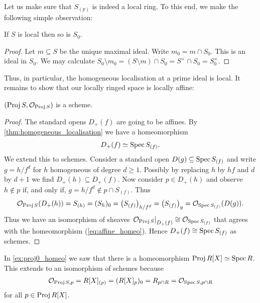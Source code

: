 \documentclass{article}
\begin{document}
Let us make sure that $S_{(p)}$ is indeed a local ring. To this end,
we make the following simple observation:
\begin{lemma}
  If $S$ is local then so is $S_0$.
  \begin{proof}
    Let $m\subseteq S$ be the unique maximal ideal. Write
    $m_0 = m \cap S_0$. This is an ideal in $S_0$. We may calculate
    $S_0\setminus m_0 = (S\setminus m)\cap S_0 = S^\times\cap S_0 = S_0^\times$.
  \end{proof}
\end{lemma}
Thus, in particular, the homogeneous localisation at a prime ideal
is local. It remains to show that our locally ringed space is
locally affine:

\begin{proposition}
  $(\operatorname{Proj} S, \mathcal O_{\operatorname{Proj} S})$ is a scheme.
  \begin{proof}
    The standard opens $D_+(f)$ are going to be affines.
    By \ref{thm:homogeneous_localisation} we have a homeomorphism
    \begin{align}\label{eq:affine_homeo}
      D_+(f) \simeq \operatorname{Spec} S_{(f)}.
    \end{align}
    We extend this to schemes. Consider a standard open
    $D(g)\subseteq \operatorname{Spec} S_{(f)}$ and write $g=h/f^d$
    for $h$ homogeneous of degree $d\geq 1$.
    Possibly by replacing $h$ by $hf$ and $d$ by $d+1$ we find
    $D_+(h)\subseteq D_+(f)$.
    Now consider $p \in D_+(h)$ and observe
    $h\not\in p$ if, and only if,
    $g = h/f^{d}\not\in p\cap S_{(f)}$.
    Thus
    \begin{align*}
      \mathcal O_{\operatorname{Proj} S}(D_+(h))
      = S_{(h)}
      = (S_h)_0
      = \left({S_{(f)}}\right)_{h/f^d}
      = \left({S_{(f)}}\right)_g
      = \mathcal O_{\operatorname{Spec} S_{(f)}}(D(g)).
    \end{align*}
    Thus we have an isomorphism of sheaves
    $\left.{\mathcal O_{\operatorname{Proj} S}}\right\vert_{D_+(f)}\cong \mathcal O_{\operatorname{Spec} S_{(f)}}$ that agrees with the homeomorphism
    (\ref{eq:affine_homeo}). Hence $D_+(f)\cong \operatorname{Spec} S_{(f)}$
    as schemes.
  \end{proof}
\end{proposition}

\begin{example}\label{ex:proj0}
  In \ref{ex:proj0_homeo} we saw that there is a homeomorphism
  $\operatorname{Proj} R[X] \simeq \operatorname{Spec} R$. This extends to an isomorphism
  of schemes because
  \begin{align*}
    \mathcal O_{\operatorname{Proj} S,p} = R[X]_{(p)}
    = (R[X]_p)_0
    = R_{p\cap R}
    = \mathcal O_{\operatorname{Spec} S,p\cap R}
  \end{align*}
  for all $p\in\operatorname{Proj} R[X]$.
\end{example}
\end{document}
